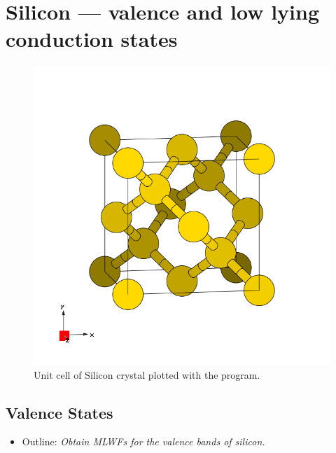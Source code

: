 \section{Silicon --- valence and low lying conduction states}
\label{sec11:silicon}

\begin{figure}[h!]
\centering
\includegraphics[width=0.25\columnwidth,trim={45pt 45pt 55pt 55pt},clip]{figure/example11/silicon.png}
\caption{Unit cell of Silicon crystal plotted with the \xcrysden{} program.}
\label{fig11.0}
\end{figure}

\subsection*{Valence States}
\begin{itemize}
\item Outline: {\it Obtain MLWFs for the valence bands of silicon.}
\end{itemize}


